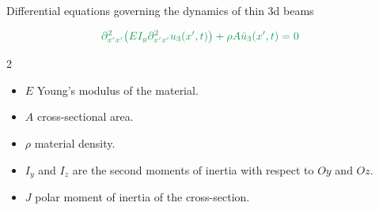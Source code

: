 \documentclass[aspectratio=169]{beamer}
\begin{document}
{\begin{frame}{Differential equations governing the dynamics of thin 3d beams}
\begin{tcolorbox}[colback=darkred!10,colframe=darkred!40!black]
\begin{align*}
            & {\color{ForestGreen} \partial_{x^\prime x^\prime}^2\big(EI_y\partial_{x^\prime x^\prime}^2u_{3}(x^\prime,t)\big)+\rho A\ddot u_{3}(x^\prime,t)=0}
    \end{align*}
  \end{tcolorbox}
  {\small
  \begin{multicols}{2}
    \begin{itemize}
      \item $E$ Young's modulus of the material.
      \item $A$ cross-sectional area.
      \item $\rho$ material density.
      \item $I_y$ and $I_z$ are the second moments of inertia with respect to $Oy$ and $Oz$.
      \item $J$ polar moment of inertia of the cross-section.
    \end{itemize}
  \end{multicols}
  }
\end{frame}
}
\end{document}

